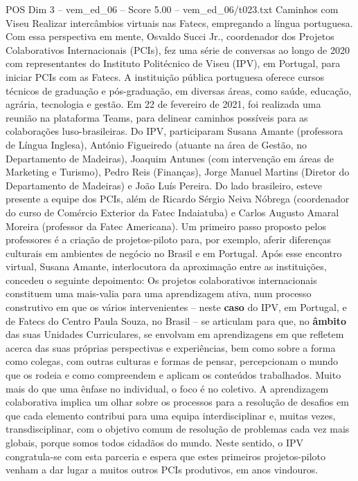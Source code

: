 \begin{textsample}{POS Dim 3 – vem\_ed\_06 – Score 5.00 – vem\_ed\_06/t023.txt}  \label{ex:f3_pos_125}
Caminhos com Viseu Realizar intercâmbios virtuais nas Fatecs, empregando a língua portuguesa.
Com essa perspectiva em mente, Osvaldo Succi Jr., coordenador dos Projetos Colaborativos Internacionais (PCIs), fez uma série de conversas ao longo de 2020 com representantes do Instituto Politécnico de Viseu (IPV), em Portugal, para iniciar PCIs com as Fatecs.
A instituição pública portuguesa oferece cursos técnicos de graduação e pós-graduação, em diversas áreas, como saúde, educação, agrária, tecnologia e gestão.
Em 22 de fevereiro de 2021, foi realizada uma reunião na plataforma Teams, para delinear caminhos possíveis para as colaborações luso-brasileiras.
Do IPV, participaram Susana Amante (professora de Língua Inglesa), António Figueiredo (atuante na área de Gestão, no Departamento de Madeiras), Joaquim Antunes (com intervenção em áreas de Marketing e Turismo), Pedro Reis (Finanças), Jorge Manuel Martins (Diretor do Departamento de Madeiras) e João Luís Pereira.
Do lado brasileiro, esteve presente a equipe dos PCIs, além de Ricardo Sérgio Neiva Nóbrega (coordenador do curso de Comércio Exterior da Fatec Indaiatuba) e Carlos Augusto Amaral Moreira (professor da Fatec Americana).
Um primeiro passo proposto pelos professores é a criação de projetos-piloto para, por exemplo, aferir diferenças culturais em ambientes de negócio no Brasil e em Portugal.
Após esse encontro virtual, Susana Amante, interlocutora da aproximação entre as instituições, concedeu o seguinte depoimento: Os projetos colaborativos internacionais constituem uma mais-valia para uma aprendizagem ativa, num processo construtivo em que os vários intervenientes – neste \textbf{caso} do IPV, em Portugal, e de Fatecs do Centro Paula Souza, no Brasil – se articulam para que, no \textbf{âmbito} das suas Unidades Curriculares, se envolvam em aprendizagens em que refletem acerca das suas próprias perspectivas e experiências, bem como sobre a forma como colegas, com outras culturas e formas de pensar, percepcionam o mundo que os rodeia e como compreendem e aplicam os conteúdos trabalhados.
Muito mais do que uma ênfase no individual, o foco é no coletivo.
A aprendizagem colaborativa implica um olhar sobre os processos para a resolução de desafios em que cada elemento contribui para uma equipa interdisciplinar e, muitas vezes, transdisciplinar, com o objetivo comum de resolução de problemas cada vez mais globais, porque somos todos cidadãos do mundo.
Neste sentido, o IPV congratula-se com esta parceria e espera que estes primeiros projetos-piloto venham a dar lugar a muitos outros PCIs produtivos, em anos vindouros.

\end{textsample}
